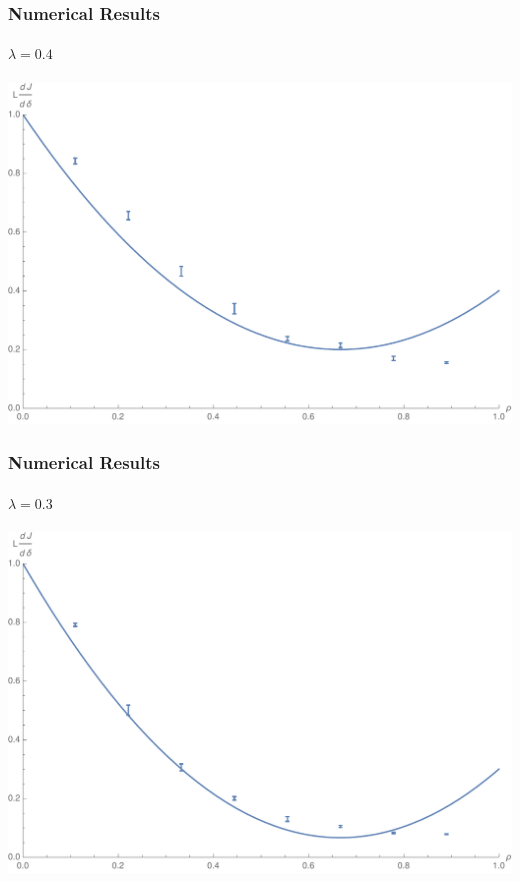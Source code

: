 \documentclass{beamer}
\begin{document}
\begin{frame}
 \frametitle{Numerical Results}
 \framesubtitle{$\lambda = 0.4$}
 \begin{center}
  \includegraphics[width=0.9\linewidth]{images/lambda0p4}
 \end{center}
\end{frame}

\begin{frame}
 \frametitle{Numerical Results}
 \framesubtitle{$\lambda = 0.3$}
 \begin{center}
  \includegraphics[width=0.9\linewidth]{images/lambda0p3}
 \end{center}
\end{frame}
\end{document}
